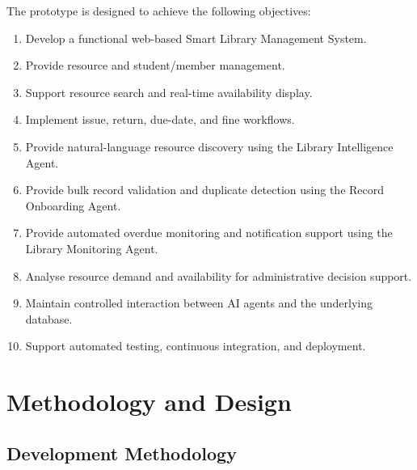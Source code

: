 \documentclass{tietreport}
\begin{document}
The prototype is designed to achieve the following objectives:

\begin{enumerate}

    \item Develop a functional web-based Smart Library Management System.

    \item Provide resource and student/member management.

    \item Support resource search and real-time availability display.

    \item Implement issue, return, due-date, and fine workflows.

    \item Provide natural-language resource discovery using the Library
    Intelligence Agent.

    \item Provide bulk record validation and duplicate detection using the
    Record Onboarding Agent.

    \item Provide automated overdue monitoring and notification support
    using the Library Monitoring Agent.

    \item Analyse resource demand and availability for administrative
    decision support.

    \item Maintain controlled interaction between AI agents and the
    underlying database.

    \item Support automated testing, continuous integration, and
    deployment.

\end{enumerate}


\chapter{Methodology and Design}

\section{Development Methodology}
\end{document}
